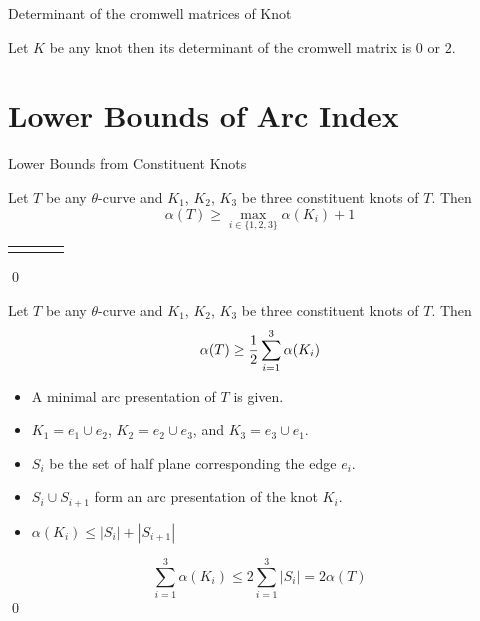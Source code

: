 \begin{frame}{Determinant of the cromwell matrices of Knot}
	\begin{thm}
		Let $K$ be any knot then its determinant of the cromwell matrix is $0$ or $2$.
	\end{thm}
	\mypf

\end{frame}

\section{Lower Bounds of Arc Index}

\begin{frame}{Lower Bounds from Constituent Knots}
	\begin{thm}
		Let $T$ be any $\theta$-curve
		and $K_1$, $K_2$, $K_3$ be three constituent knots of $T$.
		Then
		\[
			\alpha(T) \ge \max_{i\in\{1,2,3\}} \alpha(K_i) + 1
		\]
	\end{thm}
	

	\mypf

	\begin{tabu}{X[c]X[c]X[c]X[c]}
			 &
			 &
			 &
	\end{tabu}
	\hfill\qed
\end{frame}


\begin{frame}
	\bigskip
	\begin{thm}
		Let $T$ be any $\theta$-curve
		and $K_1$, $K_2$, $K_3$ be three constituent knots of $T$.
		Then
		\[
			\centerline{$\displaystyle\alpha(T) \ge \frac12 \sum_{i=1}^3\alpha(K_i)$}
		\]
	\end{thm}
	
	\mypf

	\begin{itemize}
		\item A minimal arc presentation of $T$ is given.
		\item $K_1 = e_1\cup e_2$, $K_2 = e_2\cup e_3$, and $K_3 = e_3\cup e_1$.
		\item $S_i$ be the set of half plane corresponding the edge $e_i$.
		\item $S_i\cup S_{i+1}$ form an arc presentation of the knot $K_i$.
		\item $\alpha(K_i) \le |S_i| + |S_{i+1}|$
	\end{itemize}
	\[
		\sum_{i=1}^3 \alpha(K_i) \le 2\sum_{i=1}^3|S_i| = 2 \alpha(T)
	\]
	\hfill\qed
\end{frame}


